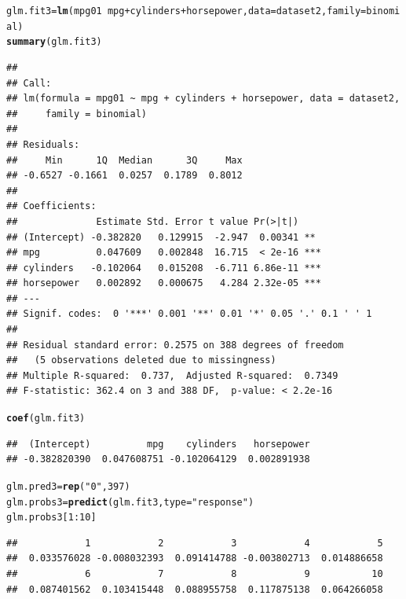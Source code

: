 \documentclass{article}\usepackage[]{graphicx}\usepackage[]{color}
\makeatletter
\newcommand{\hlnum}[1]{\textcolor[rgb]{0.686,0.059,0.569}{#1}}%
\newcommand{\hlstr}[1]{\textcolor[rgb]{0.192,0.494,0.8}{#1}}%
\newcommand{\hlopt}[1]{\textcolor[rgb]{0,0,0}{#1}}%
\newcommand{\hlstd}[1]{\textcolor[rgb]{0.345,0.345,0.345}{#1}}%
\newcommand{\hlkwb}[1]{\textcolor[rgb]{0.69,0.353,0.396}{#1}}%
\newcommand{\hlkwc}[1]{\textcolor[rgb]{0.333,0.667,0.333}{#1}}%
\newcommand{\hlkwd}[1]{\textcolor[rgb]{0.737,0.353,0.396}{\textbf{#1}}}%
\newenvironment{kframe}{%
 \def\at@end@of@kframe{}%
 \ifinner\ifhmode%
  \def\at@end@of@kframe{\end{minipage}}%
  \begin{minipage}{\columnwidth}%
 \fi\fi%
 \def\FrameCommand##1{\hskip\@totalleftmargin \hskip-\fboxsep
 \colorbox{shadecolor}{##1}\hskip-\fboxsep
     \hskip-\linewidth \hskip-\@totalleftmargin \hskip\columnwidth}%
 \MakeFramed {\advance\hsize-\width
   \@totalleftmargin\z@ \linewidth\hsize
   \@setminipage}}%
 {\par\unskip\endMakeFramed%
 \at@end@of@kframe}
\newenvironment{knitrout}{}{} %
\makeatother
\begin{document}
\begin{enumerate}[(a)]
\begin{knitrout}
\begin{kframe}
{\ttfamily\noindent\itshape\color{messagecolor}{\#\# The following object is masked from package:ggplot2:\\\#\# \\\#\#\ \ \ \  mpg}}\begin{alltt}
\hlstd{glm.fit3}\hlkwb{=}\hlkwd{lm}\hlstd{(mpg01}\hlopt{~}\hlstd{mpg}\hlopt{+}\hlstd{cylinders}\hlopt{+}\hlstd{horsepower,}\hlkwc{data}\hlstd{=dataset2,} \hlkwc{family} \hlstd{= binomial)}
\hlkwd{summary}\hlstd{(glm.fit3)}
\end{alltt}
\begin{verbatim}
## 
## Call:
## lm(formula = mpg01 ~ mpg + cylinders + horsepower, data = dataset2, 
##     family = binomial)
## 
## Residuals:
##     Min      1Q  Median      3Q     Max 
## -0.6527 -0.1661  0.0257  0.1789  0.8012 
## 
## Coefficients:
##              Estimate Std. Error t value Pr(>|t|)    
## (Intercept) -0.382820   0.129915  -2.947  0.00341 ** 
## mpg          0.047609   0.002848  16.715  < 2e-16 ***
## cylinders   -0.102064   0.015208  -6.711 6.86e-11 ***
## horsepower   0.002892   0.000675   4.284 2.32e-05 ***
## ---
## Signif. codes:  0 '***' 0.001 '**' 0.01 '*' 0.05 '.' 0.1 ' ' 1
## 
## Residual standard error: 0.2575 on 388 degrees of freedom
##   (5 observations deleted due to missingness)
## Multiple R-squared:  0.737,	Adjusted R-squared:  0.7349 
## F-statistic: 362.4 on 3 and 388 DF,  p-value: < 2.2e-16
\end{verbatim}
\begin{alltt}
\hlkwd{coef}\hlstd{(glm.fit3)}
\end{alltt}
\begin{verbatim}
##  (Intercept)          mpg    cylinders   horsepower 
## -0.382820390  0.047608751 -0.102064129  0.002891938
\end{verbatim}
\begin{alltt}
\hlstd{glm.pred3}\hlkwb{=}\hlkwd{rep}\hlstd{(}\hlstr{"0"}\hlstd{,} \hlnum{397}\hlstd{)}
\hlstd{glm.probs3}\hlkwb{=}\hlkwd{predict}\hlstd{(glm.fit3,}\hlkwc{type}\hlstd{=}\hlstr{"response"}\hlstd{)}
\hlstd{glm.probs3[}\hlnum{1}\hlopt{:}\hlnum{10}\hlstd{]}
\end{alltt}
\begin{verbatim}
##            1            2            3            4            5 
##  0.033576028 -0.008032393  0.091414788 -0.003802713  0.014886658 
##            6            7            8            9           10 
##  0.087401562  0.103415448  0.088955758  0.117875138  0.064266058
\end{verbatim}
\begin{alltt}

\end{alltt}
\end{kframe}
\end{knitrout}
\end{enumerate}
\end{document}
